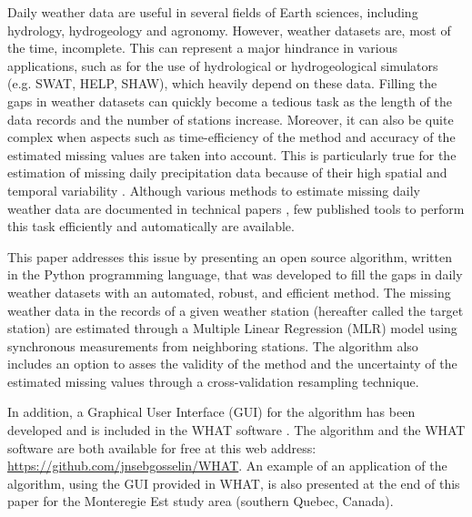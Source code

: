 \documentclass[TechnicalNoteMeteo.tex]{subfiles}
\begin{document}
Daily weather data are useful in several fields of Earth sciences, including hydrology, hydrogeology and agronomy. However, weather datasets are, most of the time, incomplete. This can represent a major hindrance in various applications, such as for the use of hydrological or hydrogeological simulators (e.g. SWAT, HELP, SHAW), which heavily depend on these data. Filling the gaps in weather datasets can quickly become a tedious task as the length of the data records and the number of stations increase. Moreover, it can also be quite complex when aspects such as time-efficiency of the method and accuracy of the estimated missing values are taken into account. This is particularly true for the estimation of missing daily precipitation data because of their high spatial and temporal variability \citep{simolo_improving_2010}. Although various methods to estimate missing daily weather data are documented in technical papers \citep[i.e.][]{degaetano_method_1995, simolo_improving_2010}, few published tools to perform this task efficiently and automatically are available.

This paper addresses this issue by presenting an open source algorithm, written in the Python programming language, that was developed to fill the gaps in daily weather datasets with an automated, robust, and efficient method. The missing weather data in the records of a given weather station (hereafter called the target station) are estimated through a Multiple Linear Regression (MLR) model using synchronous measurements from neighboring stations. The algorithm also includes an option to asses the validity of the method and the uncertainty of the estimated missing values through a cross-validation resampling technique. 
 
In addition, a Graphical User Interface (GUI) for the algorithm has been developed and is included in the WHAT software \citep{gosselin_what_2015}. The algorithm and the WHAT software are both available for free at this web address: \url{https://github.com/jnsebgosselin/WHAT}. An example of an application of the algorithm, using the GUI provided in WHAT, is also presented at the end of this paper for the Monteregie Est study area (southern Quebec, Canada).
\end{document}
